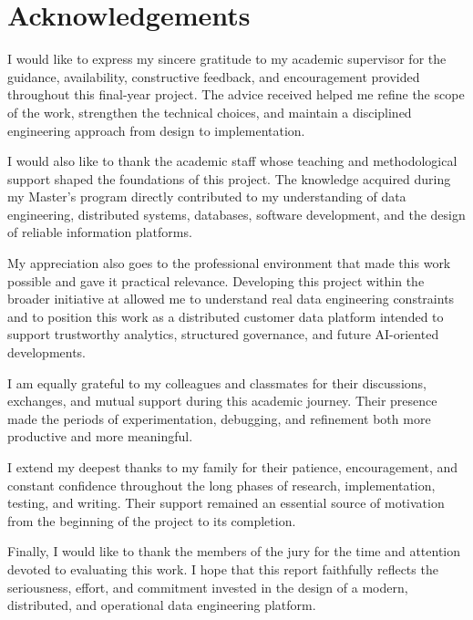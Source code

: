 \chapter*{Acknowledgements}
\thispagestyle{plain}

I would like to express my sincere gratitude to my academic supervisor for the guidance, availability, constructive feedback, and encouragement provided throughout this final-year project. The advice received helped me refine the scope of the work, strengthen the technical choices, and maintain a disciplined engineering approach from design to implementation.

I would also like to thank the academic staff whose teaching and methodological support shaped the foundations of this project. The knowledge acquired during my Master's program directly contributed to my understanding of data engineering, distributed systems, databases, software development, and the design of reliable information platforms.

My appreciation also goes to the professional environment that made this work possible and gave it practical relevance. Developing this project within the broader \initiative{} initiative at \companyname{} allowed me to understand real data engineering constraints and to position this work as a distributed customer data platform intended to support trustworthy analytics, structured governance, and future AI-oriented developments.

I am equally grateful to my colleagues and classmates for their discussions, exchanges, and mutual support during this academic journey. Their presence made the periods of experimentation, debugging, and refinement both more productive and more meaningful.

I extend my deepest thanks to my family for their patience, encouragement, and constant confidence throughout the long phases of research, implementation, testing, and writing. Their support remained an essential source of motivation from the beginning of the project to its completion.

Finally, I would like to thank the members of the jury for the time and attention devoted to evaluating this work. I hope that this report faithfully reflects the seriousness, effort, and commitment invested in the design of a modern, distributed, and operational data engineering platform.

\clearpage
